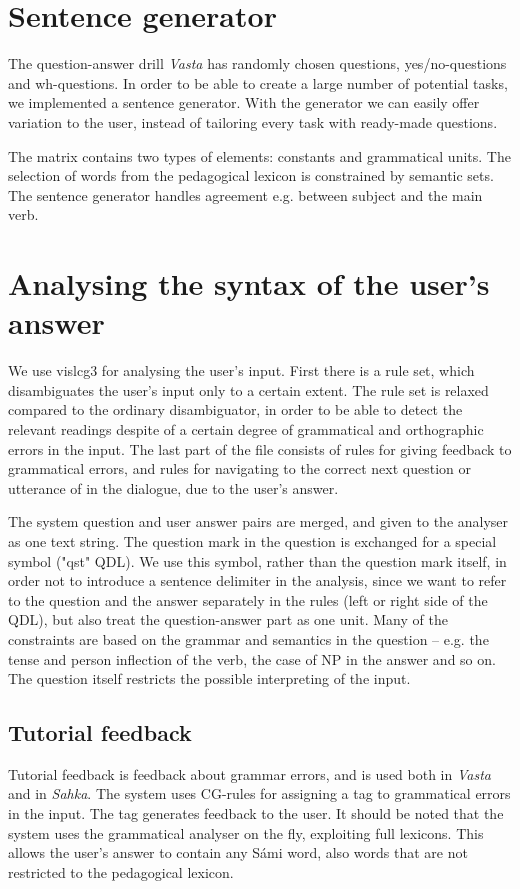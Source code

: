 \documentclass[11pt]{article}
\begin{document}
\section{Sentence generator}
The question-answer drill \textit{Vasta} has randomly chosen questions, yes/no-questions and wh-questions. In order to be able to create a large number of potential tasks, we implemented a sentence generator. With the generator we can easily offer variation to the user, instead of tailoring every task with ready-made questions.

The matrix contains two types of elements: constants and grammatical units. The selection of words from the pedagogical lexicon is constrained by semantic sets. The sentence generator handles agreement e.g. between subject and the main verb.
 
\section{Analysing the syntax of the user's answer} 
We use vislcg3 for analysing the user's input. First there is a rule set, which disambiguates the user's input only to a certain extent. The rule set is relaxed compared to the ordinary disambiguator, in order to be able to detect the relevant readings despite of a certain degree of grammatical and orthographic errors in the input. The last part of the file consists of rules for giving feedback to grammatical errors, and rules for navigating to the correct next question or utterance of in the dialogue, due to the user's answer.  

The system question and user answer pairs are merged, and given to the analyser as one text string. The question mark in the question is exchanged for a special symbol ("qst" QDL). We use this symbol, rather than the question mark itself, in order not to introduce a sentence delimiter in the analysis, since we want to refer to the question and the answer separately in the rules (left or right side of the QDL), but also treat the question-answer part as one unit. Many of the constraints are based on the grammar and semantics in the question -- e.g. the tense and person inflection of the verb, the case of NP in the answer and so on. The question itself restricts the possible interpreting of the input.

\subsection{Tutorial feedback}
Tutorial feedback is feedback about grammar errors, and is used both in \textit{Vasta} and in \textit{Sahka}. The system uses CG-rules for assigning a tag to grammatical errors in the input. The tag generates feedback to the user. It should be noted that the system uses the grammatical analyser on the fly, exploiting full lexicons. This allows the user's answer to contain any Sámi word, also words that are not restricted to the pedagogical lexicon.
\end{document}

